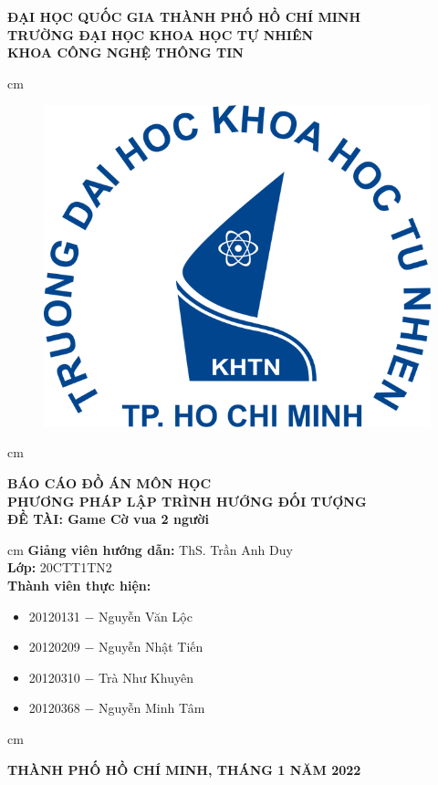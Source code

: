 \begin{titlepage}
\begin{mybox}
\begin{center}
\fontsize{12}{12}\selectfont
\textbf{ĐẠI HỌC QUỐC GIA THÀNH PHỐ HỒ CHÍ MINH}\\
\textbf{TRƯỜNG ĐẠI HỌC KHOA HỌC TỰ NHIÊN}\\
\textbf{KHOA CÔNG NGHỆ THÔNG TIN}
\end{center}
 cm
\begin{figure}[H]
\begin{center}
\includegraphics[scale=0.25]{images/logo}
\end{center}
\end{figure}
 cm
\begin{center}
\fontsize{18}{14}\selectfont
\textbf{BÁO CÁO ĐỒ ÁN MÔN HỌC}\\
\fontsize{26}{16}\selectfont
\textbf{PHƯƠNG PHÁP LẬP TRÌNH HƯỚNG ĐỐI TƯỢNG}\\
\fontsize{18}{12}\selectfont
\textbf{ĐỀ TÀI: Game Cờ vua 2 người}
\end{center}
 cm
\fontsize{14}{12}\selectfont
\textbf{Giảng viên hướng dẫn:} ThS. Trần Anh Duy\\
\textbf{Lớp:} 20CTT1TN2\\
\textbf{Thành viên thực hiện:}
\begin{itemize}
\item 20120131 $-$ Nguyễn Văn Lộc
\item 20120209 $-$ Nguyễn Nhật Tiến
\item 20120310 $-$ Trà Như Khuyên
\item 20120368 $-$ Nguyễn Minh Tâm
\end{itemize}
 cm
\begin{center}
\textbf{THÀNH PHỐ HỒ CHÍ MINH, THÁNG 1 NĂM 2022}
\end{center}
\end{mybox}
\end{titlepage}